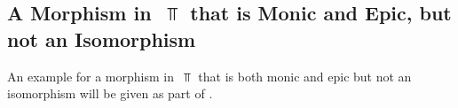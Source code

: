 \subsection{A Morphism in~\texorpdfstring{$\Top$}{Top} that is Monic and Epic, but not an Isomorphism}

An example for a morphism in~$\Top$ that is both monic and epic but not an isomorphism will be given as part of .
